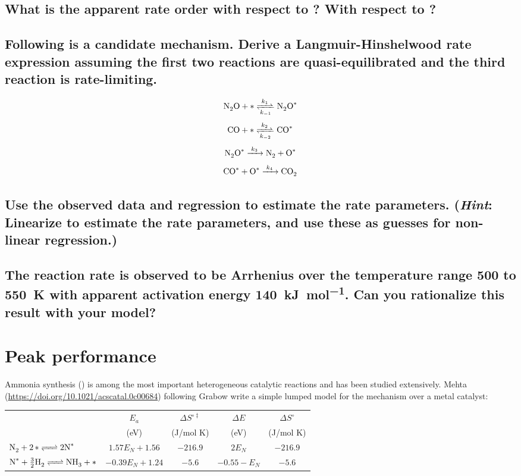 \documentclass[11pt]{article}
\begin{document}
\subsection{What is the apparent rate order with respect to ? With respect to ?}
\label{sec:orgc069e64}

\subsection{Following is a candidate mechanism. Derive a Langmuir-Hinshelwood rate expression assuming the first two reactions are quasi-equilibrated and the third reaction is rate-limiting.}
\label{sec:org8e54c58}

\[ \ce{N2O + \ast{} <=>[k_1][k_{-1}] N2O^\ast} \]
\[ \ce{CO + \ast{} <=>[k_2][k_{-2}] CO^\ast} \]
\[ \ce{N2O^\ast{} ->[k_3] N2 + O^\ast} \]
\[ \ce{CO^\ast{} + O^\ast{} ->[k_4] CO2 } \]

\subsection{Use the observed data and regression to estimate the rate parameters. (\emph{Hint}: Linearize to estimate the rate parameters, and use these as guesses for non-linear regression.)}
\label{sec:org8f7fac8}

\subsection{The reaction rate is observed to be Arrhenius over the temperature range 500 to \SI{550}{K} with apparent activation energy \SI{140}{\kilo\joule\per\mole}. Can you rationalize this result with your model?}
\label{sec:org9eb99a6}

\section{Peak performance}
\label{sec:org2eebe53}
Ammonia synthesis () is among the most important heterogeneous catalytic reactions and has been studied extensively. Mehta (\url{https://doi.org/10.1021/acscatal.0c00684}) following Grabow write a simple lumped model for the mechanism over a metal catalyst:

\begin{center}
\begin{tabular}{lcccc}
\hline
 & \(E_a\) & \(\Delta S^{\circ\ddagger}\) & \(\Delta E\) & \(\Delta S^\circ\)\\
 & (eV) & (J/mol K) & (eV) & (J/mol K)\\
\hline
\(\ce{N2 + 2\ast{} <=> 2 N^\ast{} }\) & \(1.57 E_N + 1.56\) & \(-216.9\) & \(2 E_N\) & \(-216.9\)\\
\(\ce{N^\ast{} + 3/2 H2 <=> NH3 + \ast{}}\) & \(-0.39 E_N + 1.24\) & \(-5.6\) & \(-0.55-E_N\) & \(-5.6\)\\
\hline
\end{tabular}
\end{center}
\end{document}
